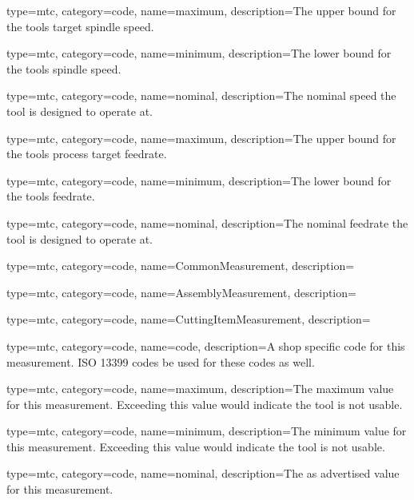 {
  type=mtc,
  category=code,
  name={maximum},
  description={The upper bound for the tools target spindle speed.}
}


{
  type=mtc,
  category=code,
  name={minimum},
  description={The lower bound for the tools spindle speed.}
}


{
  type=mtc,
  category=code,
  name={nominal},
  description={The nominal speed the tool is designed to operate at.}
}


{
  type=mtc,
  category=code,
  name={maximum},
  description={The upper bound for the tools process target feedrate.}
}


{
  type=mtc,
  category=code,
  name={minimum},
  description={The lower bound for the tools feedrate.}
}


{
  type=mtc,
  category=code,
  name={nominal},
  description={The nominal feedrate the tool is designed to operate at.}
}


{
  type=mtc,
  category=code,
  name={CommonMeasurement},
  description={}
}


{
  type=mtc,
  category=code,
  name={AssemblyMeasurement},
  description={}
}


{
  type=mtc,
  category=code,
  name={CuttingItemMeasurement},
  description={}
}


{
  type=mtc,
  category=code,
  name={code},
  description={A shop specific code for this measurement. ISO 13399 codes \MAY be used for these codes as well.}
}


{
  type=mtc,
  category=code,
  name={maximum},
  description={The maximum value for this measurement. Exceeding this value would indicate the tool is not usable.}
}


{
  type=mtc,
  category=code,
  name={minimum},
  description={The minimum value for this measurement. Exceeding this value would indicate the tool is not usable.}
}


{
  type=mtc,
  category=code,
  name={nominal},
  description={The as advertised value for this measurement.}
}


